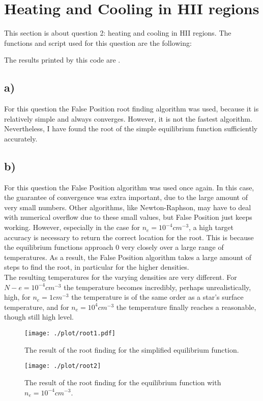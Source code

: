 \section{Heating and Cooling in HII regions}
This section is about question 2: heating and cooling in HII regions.
The functions and script used for this question are the following:

The results printed by this code are
.
\subsection*{a)}
For this question the False Position root finding algorithm was used, because it is relatively simple and always converges. However, it is not the fastest algorithm. Nevertheless, I have found the root of the simple equilibrium function sufficiently accurately.

\subsection*{b)}
For this question the False Position algorithm was used once again. In this case, the guarantee of convergence was extra important, due to the large amount of very small numbers. Other algorithms, like Newton-Raphson, may have to deal with numerical overflow due to these small values, but False Position just keeps working. However, especially in the case for $n_e = 10^{-4} cm^{-3}$, a high target accuracy is necessary to return the correct location for the root. This is because the equilibrium functions approach 0 very closely over a large range of temperatures. As a result, the False Position algorithm takes a large amount of steps to find the root, in particular for the higher densities.\\
The resulting temperatures for the varying densities are very different. For $N-e = 10^{-4} cm^{-3}$ the temperature becomes incredibly, perhaps unrealistically, high, for $n_e = 1 cm^{-3}$ the temperature is of the same order as a star's surface temperature, and for $n_e = 10^4 cm^{-3}$ the temperature finally reaches a reasonable, though still high level.

\begin{figure}[!h]
    \centering
    \texttt{[image: ./plot/root1.pdf]}
    \caption{The result of the root finding for the simplified equilibrium function.}
    \label{fig:root1}
\end{figure}

\begin{figure}[!h]
    \centering
    \texttt{[image: ./plot/root2]}
    \caption{The result of the root finding for the equilibrium function with $n_e = 10^{-4} cm^{-3}$.}
    \label{fig:root2}
\end{figure}


